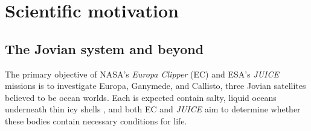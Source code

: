 \documentclass[12pt]{article}
\begin{document}
%
%
\section{Scientific motivation}
\subsection{The Jovian system and beyond}
The primary objective of NASA's \textit{Europa Clipper} (EC)\cite{pC14_EC} and ESA's \textit{JUICE}\citep{oG13} missions is to investigate Europa, Ganymede, and Callisto, three Jovian satellites believed to be ocean worlds. Each is expected contain salty, liquid oceans underneath thin icy shells \citep{rP99,fN16}, and both EC and \textit{JUICE} aim to determine whether these bodies contain necessary conditions for life\citep{tB24}. 
\end{document}
